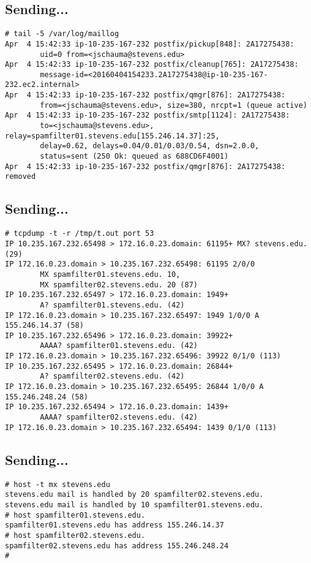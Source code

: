 \documentclass[xga]{xdvislides}
\begin{document}
\subsection{Sending...}
\begin{verbatim}
# tail -5 /var/log/maillog
Apr  4 15:42:33 ip-10-235-167-232 postfix/pickup[848]: 2A17275438:
        uid=0 from=<jschauma@stevens.edu>
Apr  4 15:42:33 ip-10-235-167-232 postfix/cleanup[765]: 2A17275438:
        message-id=<20160404154233.2A17275438@ip-10-235-167-232.ec2.internal>
Apr  4 15:42:33 ip-10-235-167-232 postfix/qmgr[876]: 2A17275438:
        from=<jschauma@stevens.edu>, size=380, nrcpt=1 (queue active)
Apr  4 15:42:33 ip-10-235-167-232 postfix/smtp[1124]: 2A17275438:
        to=<jschauma@stevens.edu>, relay=spamfilter01.stevens.edu[155.246.14.37]:25,
        delay=0.62, delays=0.04/0.01/0.03/0.54, dsn=2.0.0,
        status=sent (250 Ok: queued as 688CD6F4001)
Apr  4 15:42:33 ip-10-235-167-232 postfix/qmgr[876]: 2A17275438: removed
\end{verbatim}

\subsection{Sending...}
\begin{verbatim}
# tcpdump -t -r /tmp/t.out port 53
IP 10.235.167.232.65498 > 172.16.0.23.domain: 61195+ MX? stevens.edu. (29)
IP 172.16.0.23.domain > 10.235.167.232.65498: 61195 2/0/0
        MX spamfilter01.stevens.edu. 10,
        MX spamfilter02.stevens.edu. 20 (87)
IP 10.235.167.232.65497 > 172.16.0.23.domain: 1949+
        A? spamfilter01.stevens.edu. (42)
IP 172.16.0.23.domain > 10.235.167.232.65497: 1949 1/0/0 A 155.246.14.37 (58)
IP 10.235.167.232.65496 > 172.16.0.23.domain: 39922+
        AAAA? spamfilter01.stevens.edu. (42)
IP 172.16.0.23.domain > 10.235.167.232.65496: 39922 0/1/0 (113)
IP 10.235.167.232.65495 > 172.16.0.23.domain: 26844+
        A? spamfilter02.stevens.edu. (42)
IP 172.16.0.23.domain > 10.235.167.232.65495: 26844 1/0/0 A 155.246.248.24 (58)
IP 10.235.167.232.65494 > 172.16.0.23.domain: 1439+
        AAAA? spamfilter02.stevens.edu. (42)
IP 172.16.0.23.domain > 10.235.167.232.65494: 1439 0/1/0 (113)
\end{verbatim}

\subsection{Sending...}
\begin{verbatim}
# host -t mx stevens.edu
stevens.edu mail is handled by 20 spamfilter02.stevens.edu.
stevens.edu mail is handled by 10 spamfilter01.stevens.edu.
# host spamfilter01.stevens.edu.
spamfilter01.stevens.edu has address 155.246.14.37
# host spamfilter02.stevens.edu.
spamfilter02.stevens.edu has address 155.246.248.24
#
\end{verbatim}
\end{document}

